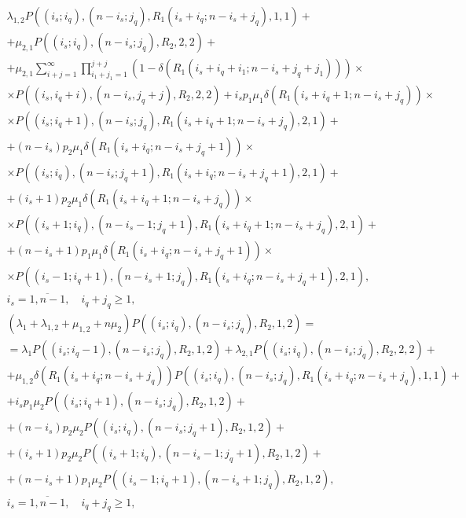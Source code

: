 {\begin{multline}
  \lambda_{1,2} P\left((i_s;i_q),(n-i_s;j_q),R_1(i_s+i_q;
    n-i_s+j_q),1,1\right) + \\ +
  \mu_{2,1}  P\left((i_s;i_q),(n-i_s;j_q),R_2,2,2\right) + \\ +
  \mu_{2,1} \sum\limits_{i+j=1}^{\infty}\prod\limits_{i_1+j_1=1}^{j+j}\left(1-\delta\left(R_1 (i_s+i_q+i_1;n-i_s+j_q+j_1) \right)\right) \times \\
  \times P\left((i_s,i_q+i),(n-i_s,j_q+j),R_2,2,2\right) +
  i_s p_1\mu_1\delta\left(R_1(i_s+i_q+1;n-i_s+j_q)\right) \times \\
  \times P\left((i_s;i_q+1),(n-i_s;j_q),R_1(i_s+i_q+1;
    n-i_s+j_q),2,1\right) + \\ +
  (n-i_s) p_2 \mu_1 \delta\left(R_1(i_s+i_q;n-i_s+j_q+1)\right) \times \\
  \times P\left((i_s;i_q),(n-i_s;j_q+1),R_1(i_s+i_q;
    n-i_s+j_q+1),2,1\right) + \\ +
  (i_s+1) p_2 \mu_1 \delta\left(R_1(i_s+i_q+1;n-i_s+j_q)\right)  \times \\
  \times P\left((i_s+1;i_q),(n-i_s-1;j_q+1),R_1(i_s+i_q+1;
    n-i_s+j_q),2,1\right) + \\ +
  (n-i_s+1) p_1\mu_1 \delta\left(R_1(i_s+i_q;n-i_s+j_q+1)\right) \times \\
  \times  P\left((i_s-1;i_q+1),(n-i_s+1;j_q),R_1(i_s+i_q; n-i_s+j_q+1),2,1\right), \\
  i_s=\overline{1,n-1}, \quad i_q+j_q\geqslant  1,
\label{eq:10.2}
\end{multline}
\begin{multline}
  \left(\lambda_1 +\lambda_{1,2}+\mu_{1,2}+n\mu_2\right)
  P\left((i_s;i_q),(n-i_s;j_q),R_2,1,2\right) = \\ =
  \lambda_1 P\left((i_s;i_q-1),(n-i_s;j_q),R_2,1,2\right) +
  \lambda_{2,1} P\left((i_s;i_q),(n-i_s;j_q),R_2,2,2\right) + \\ +
  \mu_{1,2}  \delta\left(R_1(i_s+i_q; n-i_s+j_q)\right)
  P\left((i_s;i_q),(n-i_s;j_q),R_1(i_s+i_q; n-i_s+j_q),1,1\right) + \\ +
  i_s p_1\mu_2  P\left((i_s;i_q+1),(n-i_s;j_q),R_2,1,2\right) + \\ +
  (n-i_s) p_2 \mu_2  P\left((i_s;i_q),(n-i_s;j_q+1),R_2,1,2\right) +
  \\ +
  (i_s+1) p_2 \mu_2  P\left((i_s+1;i_q),(n-i_s-1;j_q+1),R_2,1,2\right)
  + \\ +
  (n-i_s+1) p_1\mu_2 P\left((i_s-1;i_q+1),(n-i_s+1;j_q),R_2,1,2\right), \\
  i_s=\overline{1,n-1}, \quad i_q+j_q\geqslant  1,

\end{multline}}
